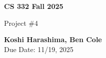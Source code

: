 \documentclass[10pt]{article}
\begin{document}
\graphicspath{{figures/}}

\begin{titlepage}
   \begin{center}
       \vspace*{9cm}

       \textbf{CS 332 Fall 2025}

       \vspace{0.5cm}
        Project \#4
        \vfill

       \textbf{Koshi Harashima, Ben Cole}\\
       Due Date: 11/19, 2025
            
   \end{center}
\end{titlepage}

\pagebreak


\usepackage[most]{tcolorbox}

\end{document}
